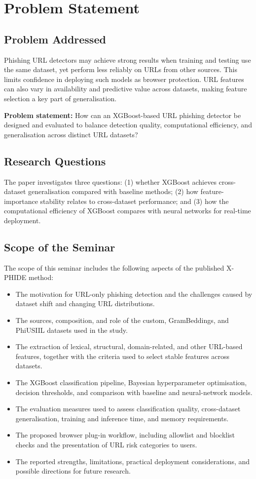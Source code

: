 \chapter{Problem Statement}
\setcounter{equation}{0}
\section{Problem Addressed}
Phishing URL detectors may achieve strong results when training and testing use the same dataset, yet perform less reliably on URLs from other sources. This limits confidence in deploying such models as browser protection. URL features can also vary in availability and predictive value across datasets, making feature selection a key part of generalisation.

\noindent\textbf{Problem statement:} How can an XGBoost-based URL phishing detector be designed and evaluated to balance detection quality, computational efficiency, and generalisation across distinct URL datasets?

\section{Research Questions}
The paper investigates three questions: (1) whether XGBoost achieves cross-dataset generalisation compared with baseline methods; (2) how feature-importance stability relates to cross-dataset performance; and (3) how the computational efficiency of XGBoost compares with neural networks for real-time deployment.\cite{bib1}

\section{Scope of the Seminar}
The scope of this seminar includes the following aspects of the published X-PHIDE method:
\begin{itemize}
\item The motivation for URL-only phishing detection and the challenges caused by dataset shift and changing URL distributions.
\item The sources, composition, and role of the custom, GramBeddings, and PhiUSIIL datasets used in the study.
\item The extraction of lexical, structural, domain-related, and other URL-based features, together with the criteria used to select stable features across datasets.
\item The XGBoost classification pipeline, Bayesian hyperparameter optimisation, decision thresholds, and comparison with baseline and neural-network models.
\item The evaluation measures used to assess classification quality, cross-dataset generalisation, training and inference time, and memory requirements.
\item The proposed browser plug-in workflow, including allowlist and blocklist checks and the presentation of URL risk categories to users.
\item The reported strengths, limitations, practical deployment considerations, and possible directions for future research.
\end{itemize}

